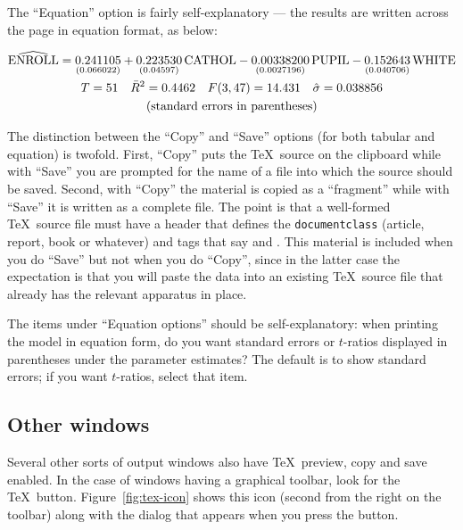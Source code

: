 The ``Equation'' option is fairly self-explanatory --- the results are
written across the page in equation format, as below:


\begin{gather}
\widehat{\rm ENROLL} = 
\underset{(0.066022)}{0.241105}
+\underset{(0.04597)}{0.223530}\,\mbox{CATHOL}
-\underset{(0.0027196)}{0.00338200}\,\mbox{PUPIL}
-\underset{(0.040706)}{0.152643}\,\mbox{WHITE}
 \notag \\
T = 51 \quad \bar{R}^2 = 0.4462 \quad F(3,47) = 14.431 \quad \hat{\sigma} = 0.038856\notag \\
\centerline{(standard errors in parentheses)} \notag
\end{gather}

The distinction between the ``Copy'' and ``Save'' options (for both
tabular and equation) is twofold.  First, ``Copy'' puts the \TeX\
source on the clipboard while with ``Save'' you are prompted for the
name of a file into which the source should be saved.  Second, with
``Copy'' the material is copied as a ``fragment'' while with ``Save''
it is written as a complete file.  The point is that a well-formed
\TeX\ source file must have a header that defines the
\texttt{documentclass} (article, report, book or whatever) and tags
that say \verb|| and \verb||.  This
material is included when you do ``Save'' but not when you do
``Copy'', since in the latter case the expectation is that you will
paste the data into an existing \TeX\ source file that already has the
relevant apparatus in place.

The items under ``Equation options'' should be self-explanatory: when
printing the model in equation form, do you want standard errors or
$t$-ratios displayed in parentheses under the parameter estimates?
The default is to show standard errors; if you want $t$-ratios, select
that item.  

\subsection{Other windows}

Several other sorts of output windows also have \TeX\ preview, copy
and save enabled.  In the case of windows having a graphical toolbar,
look for the \TeX\ button.  Figure~\ref{fig:tex-icon} shows this icon
(second from the right on the toolbar) along with the dialog that
appears when you press the button.

